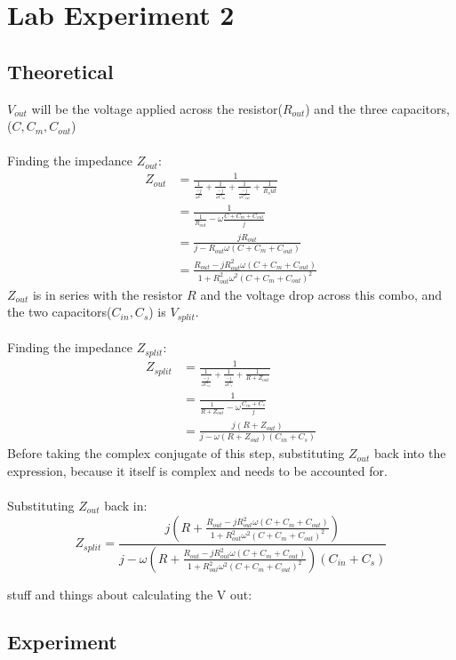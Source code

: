 \documentclass[a4paper,12pt]{article}
\newcommand{\F}[2]{\ensuremath{\frac{#1}{#2}}}
\newcommand{\LP}{\left(}
\newcommand{\RP}{\right)}
\begin{document}
\section*{Lab Experiment 2}
\subsection*{Theoretical}
$V_{out}$ will be the voltage applied across the resistor($R_{out}$) and the three capacitors, ($C,C_{m},C_{out}$)\\
\\
Finding the impedance $Z_{out}$:
\begin{align*}
Z_{out}&=\F{1}{\F{1}{\F{-j}{\omega C}}+\F{1}{\F{-j}{\omega C_m}}+\F{1}{\F{-j}{\omega C_{out}}}+\F{1}{R_out}}\\
&=\F{1}{\F{1}{R_{out}}-\omega\F{C+C_m+C_{out}}{j}}\\
&=\F{jR_{out}}{j-R_{out}\omega(C+C_m+C_{out})}\\
&=\F{R_{out}-jR_{out}^2\omega(C+C_m+C_{out})}{1+R_{out}^2\omega^2(C+C_m+C_{out})^2}
\end{align*}
$Z_{out}$ is in series with the resistor $R$ and the voltage drop across this combo, and the two capacitors($C_{in}, C_s$) is $V_{split}$.\\
\\
Finding the impedance $Z_{split}$:
\begin{align*}
Z_{split}&=\F{1}{\F{1}{\F{-j}{\omega C_{in}}}+\F{1}{\F{-j}{\omega C_s}}+\F{1}{R+Z_{out}}}\\
&=\F{1}{\F{1}{R+Z_{out}}-\omega\F{C_{in}+C_s}{j}}\\
&=\F{j(R+Z_{out})}{j-\omega(R+Z_{out})(C_{in}+C_s)}
\end{align*}
Before taking the complex conjugate of this step, substituting $Z_{out}$ back into the expression, because it itself is complex and needs to be accounted for.\\
\\
Substituting $Z_{out}$ back in:
\[Z_{split}=\F{j\LP R+\F{R_{out}-jR_{out}^2\omega(C+C_m+C_{out})}{1+R_{out}^2\omega^2(C+C_m+C_{out})^2}\RP}{j-\omega\LP R+\F{R_{out}-jR_{out}^2\omega(C+C_m+C_{out})}{1+R_{out}^2\omega^2(C+C_m+C_{out})^2}\RP(C_{in}+C_s)}\]

stuff and things about calculating the V out:

\subsection*{Experiment}
\end{document}
